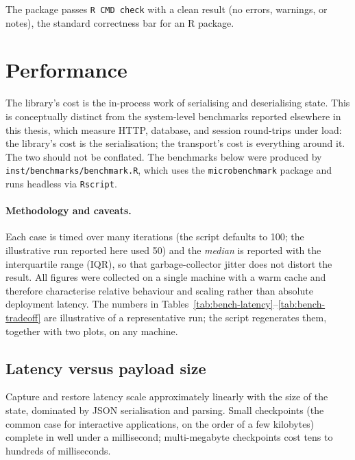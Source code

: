 \documentclass[11pt,a4paper]{article}
\begin{document}
The package passes \texttt{R~CMD~check} with a clean result (no errors, warnings,
or notes), the standard correctness bar for an R package.

\section{Performance}
\label{sec:performance}

The library's cost is the in-process work of serialising and deserialising
state. This is conceptually distinct from the system-level benchmarks reported
elsewhere in this thesis, which measure HTTP, database, and session round-trips
under load: the library's cost is the serialisation; the transport's cost is
everything around it. The two should not be conflated. The benchmarks below were
produced by \texttt{inst/benchmarks/benchmark.R}, which uses the
\texttt{microbenchmark} package and runs headless via \texttt{Rscript}.

\paragraph{Methodology and caveats.} Each case is timed over many iterations
(the script defaults to 100; the illustrative run reported here used 50) and the
\emph{median} is reported with the interquartile range (IQR), so that
garbage-collector jitter does not distort the result. All figures
were collected on a single machine with a warm cache and therefore characterise
relative behaviour and scaling rather than absolute deployment latency. The
numbers in Tables~\ref{tab:bench-latency}--\ref{tab:bench-tradeoff} are
illustrative of a representative run; the script regenerates them, together with
two plots, on any machine.

\subsection{Latency versus payload size}

Capture and restore latency scale approximately linearly with the size of the
state, dominated by JSON serialisation and parsing. Small checkpoints (the
common case for interactive applications, on the order of a few kilobytes)
complete in well under a millisecond; multi-megabyte checkpoints cost tens to
hundreds of milliseconds.
\end{document}
